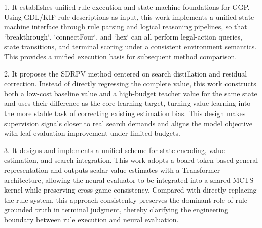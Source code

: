 
1. It establishes unified rule execution and state-machine foundations for GGP. Using GDL/KIF rule descriptions as input, this work implements a unified state-machine interface through rule parsing and logical reasoning pipelines, so that `breakthrough`, `connectFour`, and `hex` can all perform legal-action queries, state transitions, and terminal scoring under a consistent environment semantics. This provides a unified execution basis for subsequent method comparison.


2. It proposes the SDRPV method centered on search distillation and residual correction. Instead of directly regressing the complete value, this work constructs both a low-cost baseline value and a high-budget teacher value for the same state and uses their difference as the core learning target, turning value learning into the more stable task of correcting existing estimation bias. This design makes supervision signals closer to real search demands and aligns the model objective with leaf-evaluation improvement under limited budgets.


3. It designs and implements a unified scheme for state encoding, value estimation, and search integration. This work adopts a board-token-based general representation and outputs scalar value estimates with a Transformer architecture, allowing the neural evaluator to be integrated into a shared MCTS kernel while preserving cross-game consistency. Compared with directly replacing the rule system, this approach consistently preserves the dominant role of rule-grounded truth in terminal judgment, thereby clarifying the engineering boundary between rule execution and neural evaluation.

